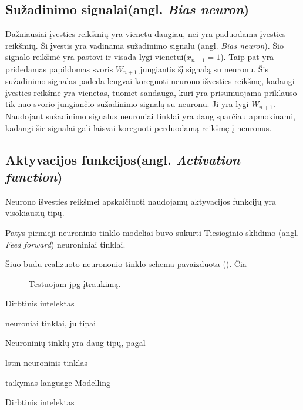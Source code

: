     \subsection{Sužadinimo signalai(angl. \textit{Bias neuron})}
Dažniausiai įvesties reikšmių yra vienetu daugiau, nei yra paduodama įvesties reikšmių. Ši įvestis yra vadinama sužadinimo signalu (angl. \textit{Bias neuron}). Šio signalo reikšmė yra pastovi ir visada lygi vienetui(\begin{math}x_{n+1} = 1\end{math}). Taip pat yra pridedamas papildomas svoris \begin{math}W_{n+1}\end{math} jungiantis šį signalą su neuronu.\cite{Ieva2012}
Šis sužadinimo signalas padeda lengvai koreguoti neurono išvesties reikšmę, kadangi įvesties reikšmė yra vienetas, tuomet sandauga, kuri yra prisumuojama priklauso tik nuo svorio jungiančio sužadinimo signalą su neuronu. Ji yra lygi  \begin{math}W_{n+1}\end{math}. Naudojant sužadinimo signalus neuroniai tinklai yra daug sparčiau apmokinami, kadangi šie signalai gali laisvai koreguoti perduodamą reikšmę į neuronus.
  \subsection{Aktyvacijos funkcijos(angl. \textit{Activation function})}
Neurono išvesties reikšmei apskaičiuoti naudojamų aktyvacijos funkcijų yra visokiausių tipų.




Patys pirmieji neuroninio tinklo modeliai buvo sukurti Tiesioginio sklidimo (angl. \textit{Feed forward}) neuroniniai tinklai.

\cite{Ieva2012}


Šiuo būdu realizuoto neurononio tinklo schema pavaizduota (). Čia




\begin{figure}
  \centering
{}
\caption{Testuojam jpg įtraukimą.}
\end{figure}



Dirbtinis intelektas


neuroniai tinklai, ju tipai


Neuroninių tinklų yra daug tipų, pagal



lstm neuroninis tinklas

taikymas language Modelling


Dirbtinis intelektas
